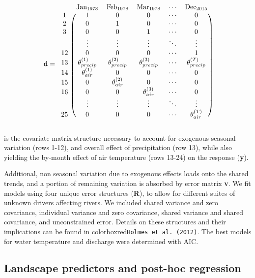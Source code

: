 \documentclass{article}
\begin{document}
$$
\textbf{d} = \begin{blockarray}{cccccc}
& \textrm{Jan}_{1978} & \textrm{Feb}_{1978} & \textrm{Mar}_{1978} & \cdots & \textrm{Dec}_{2015} \\
\begin{block}{c(ccccc)}
    1 & 1 & 0 & 0 & \cdots & 0 \\
    2 & 0 & 1 & 0 & \cdots & 0 \\
    3 & 0 & 0 & 1 & \cdots & 0 \\
      & \vdots & \vdots & \vdots & \ddots & \vdots \\
    12 & 0 & 0 & 0 & \cdots & 1 \\
    13 & \theta_{precip}^{(1)} & \theta_{precip}^{(2)} & \theta_{precip}^{(3)} & \cdots & \theta_{precip}^{(T)} \\
    14 & \theta_{air}^{(1)} & 0 & 0 & \cdots & 0 \\
    15 & 0 & \theta_{air}^{(2)} & 0 & \cdots & 0 \\
    16 & 0 & 0 & \theta_{air}^{(3)} & \cdots & 0 \\
      & \vdots & \vdots & \vdots & \ddots & \vdots \\
    25 & 0 & 0 & 0 & \cdots & \theta_{air}^{(T)} \\
\end{block}
\end{blockarray}
$$

is the covariate matrix structure necessary to account for exogenous seasonal variation (rows 1-12), and overall effect of precipitation (row 13), while also yielding the by-month effect of air temperature (rows 13-24) on the response (\textbf{y}).

Additional, non seasonal variation due to exogenous effects loads onto the shared trends, and a portion of remaining variation is absorbed by error matrix \textbf{v}. We fit models using four unique error structures (\textbf{R}), to allow for different suites of unknown drivers affecting rivers. We included shared variance and zero covariance, individual variance and zero covariance, shared variance and shared covariance, and unconstrained error. Details on these structures and their implications can be found in colorbox{red}{\lstinline{Holmes et al. (2012)}}. The best models for water temperature and discharge were determined with AIC.

\subsection*{Landscape predictors and post-hoc regression}
\end{document}
